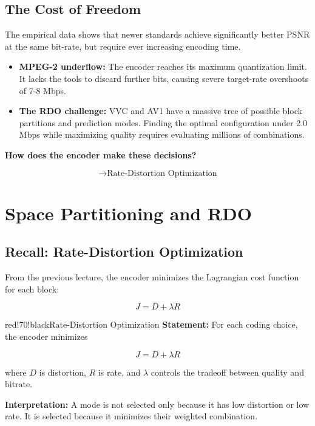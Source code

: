\subsection{The Cost of Freedom}

The empirical data shows that newer standards achieve significantly better PSNR at the same bit-rate, but require ever increasing encoding time.

\begin{itemize}
\item \textbf{MPEG-2 underflow:} The encoder reaches its maximum quantization limit. It lacks the tools to discard further bits, causing severe target-rate overshoots of 7-8 Mbps.
\item \textbf{The RDO challenge:} VVC and AV1 have a massive tree of possible block partitions and prediction modes. Finding the optimal configuration under 2.0 Mbps while maximizing quality requires evaluating millions of combinations.
\end{itemize}

\textbf{How does the encoder make these decisions?}

\[
\rightarrow \text{Rate-Distortion Optimization}
\]

\section{Space Partitioning and RDO}

\subsection{Recall: Rate-Distortion Optimization}

From the previous lecture, the encoder minimizes the Lagrangian cost function for each block:

\[
J = D + \lambda R \tag{1}
\]

\begin{calloutbox}{red!70!black}{Rate-Distortion Optimization}
\textbf{Statement:} For each coding choice, the encoder minimizes

\[
J = D + \lambda R
\]

where $D$ is distortion, $R$ is rate, and $\lambda$ controls the tradeoff between quality and bitrate.

\textbf{Interpretation:} A mode is not selected only because it has low distortion or low rate. It is selected because it minimizes their weighted combination.
\end{calloutbox}


